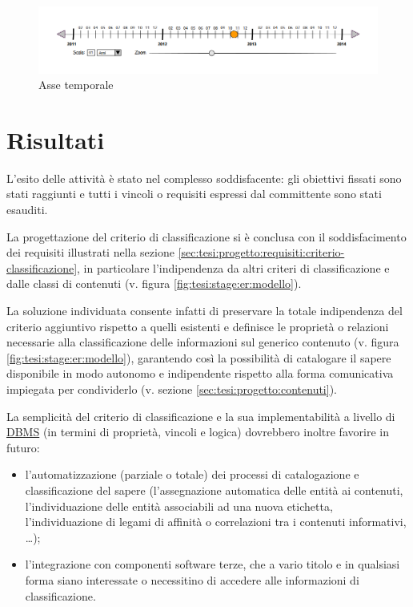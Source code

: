 \begin{figure}[ht]
	\begin{center}
		\includegraphics[width=12cm]{img/timeline.png}
		\caption{Asse temporale}
		\label{fig:tesi:stage:design:timeline}
	\end{center}
\end{figure}

\section{Risultati}
L'esito delle attività è stato nel complesso soddisfacente: gli obiettivi fissati sono stati raggiunti e tutti i vincoli o requisiti espressi dal committente sono stati esauditi.

La progettazione del criterio di classificazione si è conclusa con il soddisfacimento dei requisiti illustrati nella sezione \ref{sec:tesi:progetto:requisiti:criterio-classificazione}, in particolare l'indipendenza da altri criteri di classificazione e dalle classi di contenuti (v. figura \ref{fig:tesi:stage:er:modello}).

La soluzione individuata consente infatti di preservare la totale indipendenza del criterio aggiuntivo rispetto a quelli esistenti e definisce le proprietà o relazioni necessarie alla classificazione delle informazioni sul generico contenuto (v. figura \ref{fig:tesi:stage:er:modello}), garantendo così la possibilità di catalogare il sapere disponibile in modo autonomo e indipendente rispetto alla forma comunicativa impiegata per condividerlo (v. sezione \ref{sec:tesi:progetto:contenuti}).

La semplicità del criterio di classificazione e la sua implementabilità a livello di \underline{DBMS} (in termini di proprietà, vincoli e logica) dovrebbero inoltre favorire in futuro:
\begin{itemize}
  \item l'automatizzazione (parziale o totale) dei processi di catalogazione e classificazione del sapere (l'assegnazione automatica delle entità ai contenuti, l'individuazione delle entità associabili ad una nuova etichetta, l'individuazione di legami di affinità o correlazioni tra i contenuti informativi, \ldots);
  \item l'integrazione con componenti software terze, che a vario titolo e in qualsiasi forma siano interessate o necessitino di accedere alle informazioni di classificazione. 
\end{itemize}

